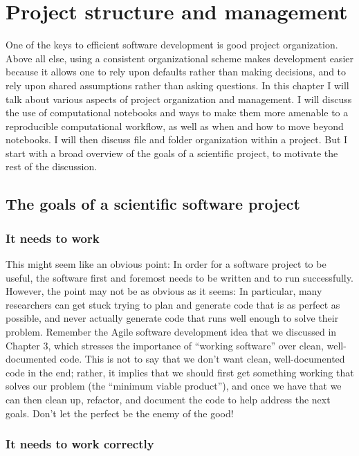 \chapter{Project structure and management}

One of the keys to efficient software development is good project organization.  Above all else, using a consistent organizational scheme makes development easier because it allows one to rely upon defaults rather than making decisions, and to rely upon shared assumptions rather than asking questions. In this chapter I will talk about various aspects of project organization and management. I will discuss the use of computational notebooks and ways to make them more amenable to a reproducible computational workflow, as well as when and how to move beyond notebooks.  I will then discuss file and folder organization within a project.  But I start with a broad overview of the goals of a scientific project, to motivate the rest of the discussion.

\section{The goals of a scientific software project}

\subsection{It needs to work}

This might seem like an obvious point: In order for a software project to be useful, the software first and foremost needs to be written and to run successfully.  However, the point may not be as obvious as it seems: In particular, many researchers can get stuck trying to plan and generate code that is as perfect as possible, and never actually generate code that runs well enough to solve their problem.  Remember the Agile software development idea that we discussed in Chapter 3, which stresses the importance of ``working software'' over clean, well-documented code. This is not to say that we don't want clean, well-documented code in the end; rather, it implies that we should first get something working that solves our problem (the ``minimum viable product''), and once we have that we can then clean up, refactor, and document the code to help address the next goals.  Don't let the perfect be the enemy of the good!

\subsection{It needs to work correctly}

